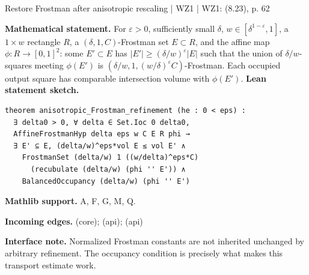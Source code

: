 \documentclass[10pt,a4paper]{article}
\newcommand{\nodecard}[1]{\hyperlink{node-#1}{\texttt{\detokenize{#1}}}}
\begin{document}
\begin{minipage}{\linewidth}
\hypertarget{node-L8_11}{}
\begin{tcolorbox}[colback=white,colframe=radialfg,colbacktitle=radialbg,coltitle=ink,boxrule=0.45pt,arc=1.6mm,left=3mm,right=3mm,top=2mm,bottom=2mm,title={\sffamily\bfseries WZ1 Lemma 8.11 \hfill \texttt{L8\_11}}]
{\sffamily\small\color{muted}Restore Frostman after anisotropic rescaling | WZ1 | WZ1: (8.23), p. 62}\par
\textbf{Mathematical statement.} For $\varepsilon>0$, sufficiently small $\delta$, $w\in[\delta^{1-\varepsilon},1]$, a $1\times w$ rectangle $R$, a $(\delta,1,C)$-Frostman set $E\subset R$, and the affine map $\phi:R\to[0,1]^2$:
some $E'\subset E$ has $|E'|\ge(\delta/w)^\varepsilon|E|$ such that the union of $\delta/w$-squares meeting $\phi(E')$ is $(\delta/w,1,(w/\delta)^\varepsilon C)$-Frostman.
Each occupied output square has comparable intersection volume with $\phi(E')$.
\smallskip\textbf{Lean statement sketch.}
\begin{Verbatim}[fontsize=\small,breaklines=true,breakanywhere=true,tabsize=2]
theorem anisotropic_Frostman_refinement (he : 0 < eps) :
  ∃ delta0 > 0, ∀ delta ∈ Set.Ioc 0 delta0,
  AffineFrostmanHyp delta eps w C E R phi →
  ∃ E' ⊆ E, (delta/w)^eps*vol E ≤ vol E' ∧
    FrostmanSet (delta/w) 1 ((w/delta)^eps*C)
      (recubulate (delta/w) (phi '' E')) ∧
    BalancedOccupancy (delta/w) (phi '' E')
\end{Verbatim}
{\footnotesize\textbf{Mathlib support.} A, F, G, M, Q.\par
\textbf{Incoming edges.} \nodecard{DFrost} (core); \nodecard{Iaffine} (api); \nodecard{Imass} (api)\par}
{\footnotesize\textbf{Interface note.} Normalized Frostman constants are not inherited unchanged by arbitrary refinement. The occupancy condition is precisely what makes this transport estimate work.}
\end{tcolorbox}\end{minipage}\par\medskip
\end{document}

